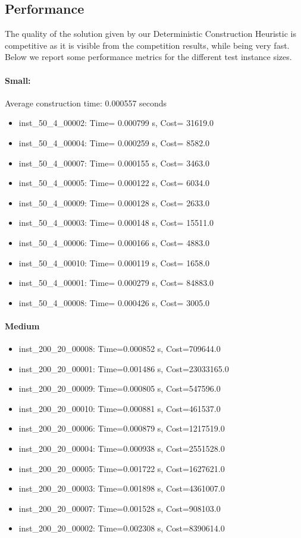 \documentclass{article}
\begin{document}
\subsection*{Performance}
The quality of the solution given by our Deterministic Construction Heuristic is competitive as it is visible from the competition results, while being very fast. Below we report some performance metrics for the different test instance sizes.

\paragraph{Small:}
Average construction time: 0.000557 seconds
\begin{itemize}
\item inst\_50\_4\_00002: Time= 0.000799 s, Cost= 31619.0   
\item inst\_50\_4\_00004: Time= 0.000259 s, Cost= 8582.0    
\item inst\_50\_4\_00007: Time= 0.000155 s, Cost= 3463.0    
\item inst\_50\_4\_00005: Time= 0.000122 s, Cost= 6034.0    
\item inst\_50\_4\_00009: Time= 0.000128 s, Cost= 2633.0    
\item inst\_50\_4\_00003: Time= 0.000148 s, Cost= 15511.0   
\item inst\_50\_4\_00006: Time= 0.000166 s, Cost= 4883.0    
\item inst\_50\_4\_00010: Time= 0.000119 s, Cost= 1658.0    
\item inst\_50\_4\_00001: Time= 0.000279 s, Cost= 84883.0   
\item inst\_50\_4\_00008: Time= 0.000426 s, Cost= 3005.0 
\end{itemize}

\paragraph{Medium}

\begin{itemize}
\item inst\_200\_20\_00008: Time=0.000852 s, Cost=709644.0  
\item inst\_200\_20\_00001: Time=0.001486 s, Cost=23033165.0
\item inst\_200\_20\_00009: Time=0.000805 s, Cost=547596.0  
\item inst\_200\_20\_00010: Time=0.000881 s, Cost=461537.0  
\item inst\_200\_20\_00006: Time=0.000879 s, Cost=1217519.0 
\item inst\_200\_20\_00004: Time=0.000938 s, Cost=2551528.0 
\item inst\_200\_20\_00005: Time=0.001722 s, Cost=1627621.0 
\item inst\_200\_20\_00003: Time=0.001898 s, Cost=4361007.0 
\item inst\_200\_20\_00007: Time=0.001528 s, Cost=908103.0  
\item inst\_200\_20\_00002: Time=0.002308 s, Cost=8390614.0 
\end{itemize}
\end{document}
